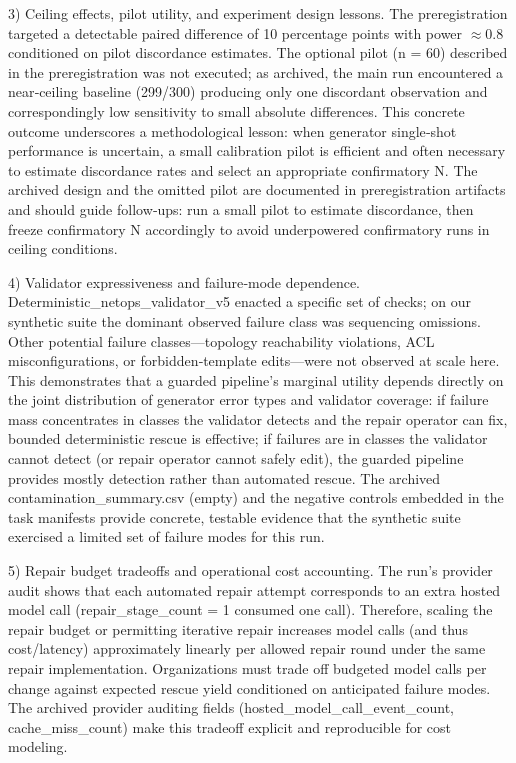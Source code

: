 \documentclass[conference]{IEEEtran}
\begin{document}
3) Ceiling effects, pilot utility, and experiment design lessons. The preregistration targeted a detectable paired difference of 10 percentage points with power \ensuremath{\approx}0.8 conditioned on pilot discordance estimates. The optional pilot (n = 60) described in the preregistration was not executed; as archived, the main run encountered a near‑ceiling baseline (299/300) producing only one discordant observation and correspondingly low sensitivity to small absolute differences. This concrete outcome underscores a methodological lesson: when generator single‑shot performance is uncertain, a small calibration pilot is efficient and often necessary to estimate discordance rates and select an appropriate confirmatory N. The archived design and the omitted pilot are documented in preregistration artifacts and should guide follow‑ups: run a small pilot to estimate discordance, then freeze confirmatory N accordingly to avoid underpowered confirmatory runs in ceiling conditions.

4) Validator expressiveness and failure‑mode dependence. Deterministic\_netops\_validator\_v5 enacted a specific set of checks; on our synthetic suite the dominant observed failure class was sequencing omissions. Other potential failure classes---topology reachability violations, ACL misconfigurations, or forbidden‑template edits---were not observed at scale here. This demonstrates that a guarded pipeline's marginal utility depends directly on the joint distribution of generator error types and validator coverage: if failure mass concentrates in classes the validator detects and the repair operator can fix, bounded deterministic rescue is effective; if failures are in classes the validator cannot detect (or repair operator cannot safely edit), the guarded pipeline provides mostly detection rather than automated rescue. The archived contamination\_summary.csv (empty) and the negative controls embedded in the task manifests provide concrete, testable evidence that the synthetic suite exercised a limited set of failure modes for this run.

5) Repair budget tradeoffs and operational cost accounting. The run's provider audit shows that each automated repair attempt corresponds to an extra hosted model call (repair\_stage\_count = 1 consumed one call). Therefore, scaling the repair budget or permitting iterative repair increases model calls (and thus cost/latency) approximately linearly per allowed repair round under the same repair implementation. Organizations must trade off budgeted model calls per change against expected rescue yield conditioned on anticipated failure modes. The archived provider auditing fields (hosted\_model\_call\_event\_count, cache\_miss\_count) make this tradeoff explicit and reproducible for cost modeling.
\end{document}
